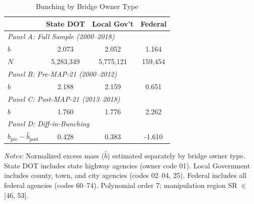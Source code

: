 \begin{table}[htbp]
\centering
\caption{Bunching by Bridge Owner Type}
\label{tab:owner}
\begin{tabular}{lccc}
\hline\hline
 & State DOT & Local Gov't & Federal \\
\hline
\multicolumn{4}{l}{\textit{Panel A: Full Sample (2000--2018)}} \\
$\hat{b}$ & 2.073 & 2.052 & 1.164 \\
$N$ & 5,283,349 & 5,775,121 & 159,454 \\
[6pt]
\multicolumn{4}{l}{\textit{Panel B: Pre-MAP-21 (2000--2012)}} \\
$\hat{b}$ & 2.188 & 2.159 & 0.651 \\
[6pt]
\multicolumn{4}{l}{\textit{Panel C: Post-MAP-21 (2013--2018)}} \\
$\hat{b}$ & 1.760 & 1.776 & 2.262 \\
[6pt]
\multicolumn{4}{l}{\textit{Panel D: Diff-in-Bunching}} \\
$\hat{b}_{\text{pre}} - \hat{b}_{\text{post}}$ & 0.428 & 0.383 & -1.610 \\
\hline\hline
\end{tabular}
\begin{tablenotes}[flushleft]\small
\item \textit{Notes:} Normalized excess mass ($\hat{b}$) estimated separately by bridge owner type. State DOT includes state highway agencies (owner code 01). Local Government includes county, town, and city agencies (codes 02--04, 25). Federal includes all federal agencies (codes 60--74). Polynomial order 7; manipulation region SR $\in$ [46, 53].
\end{tablenotes}
\end{table}

